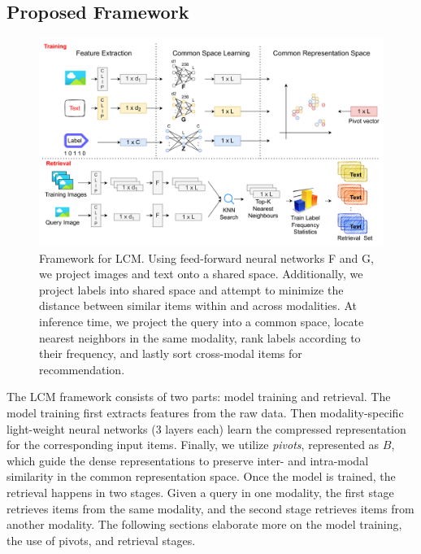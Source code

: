 \subsection{Proposed Framework}
\begin{figure}[h]
    \centering
    \includegraphics[width=\textwidth]{Figures/lcm.png}
    \caption{Framework for LCM. Using feed-forward neural networks F and G, we project images and text onto a shared space. Additionally, we project labels into shared space and attempt to minimize the distance between similar items within and across modalities. At inference time, we project the query into a common space, locate nearest neighbors in the same modality, rank labels according to their frequency, and lastly sort cross-modal items for recommendation.}
    \label{fig:deepsrlch_framework}
\end{figure}
The LCM framework consists of two parts: model training and retrieval. The model training first extracts features from the raw data. Then modality-specific light-weight neural networks (3 layers each) learn the compressed representation for the corresponding input items. Finally, we utilize \emph{pivots}, represented as $B$, which guide the dense representations to preserve inter- and intra-modal similarity in the common representation space. Once the model is trained, the retrieval happens in two stages. Given a query in one modality, the first stage retrieves items from the same modality, and the second stage retrieves items from another modality. The following sections elaborate more on the model training, the use of pivots, and retrieval stages.
    
